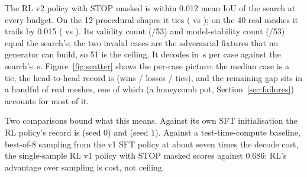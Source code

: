 The RL v2 policy with STOP masked is within 0.012 mean IoU of the search at every budget. On the 12 procedural shapes
it ties (\meanRlVTwoNostopProc{} vs \meanGreedyVOneProc); on the 40 real meshes it trails by 0.015 (\meanRlVTwoNostopReal{} vs
\meanGreedyVOneReal). Its validity count (\validRlVTwoNostop/53) and model-stability count (\stableRlVTwoNostop/53) equal the
search's; the two invalid cases are the adversarial fixtures that no generator can build, so 51 is the ceiling. It
decodes in \secsRlVTwoNostop\,s per case against the search's \secsGreedyVOne\,s. Figure~\ref{fig:scatter} shows the per-case
picture: the median case is a tie, the head-to-head record is \hhRlVTwoNostopVsGreedyVOne{} (wins / losses / ties), and the
remaining gap sits in a handful of real meshes, one of which (a honeycomb pot, Section~\ref{sec:failures}) accounts for most of it.

Two comparisons bound what this means. Against its own SFT initialisation the RL policy's record is
\hhRlVTwoNostopVsSftVTwo{} (seed 0) and \hhRlVTwoSOneNostopVsSftVTwoSOne{} (seed 1). Against a test-time-compute baseline, best-of-8 sampling
from the v1 SFT policy at about seven times the decode cost, the single-sample RL v1 policy with STOP masked scores
\meanRlVOneNostopTwoHundred{} against 0.686: RL's advantage over sampling is cost, not ceiling.

